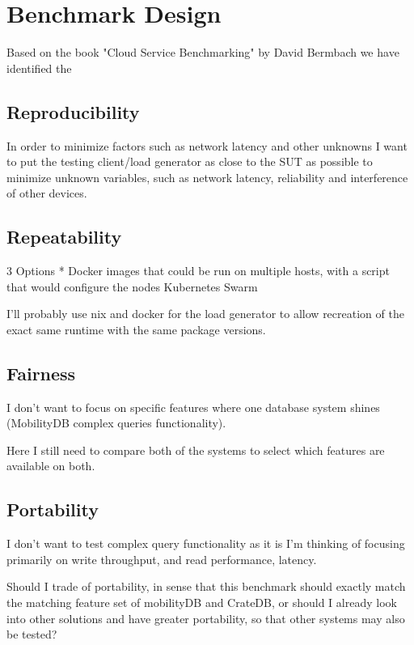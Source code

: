 \section{Benchmark Design}
\label{cha:benchmarkdesign}

Based on the book "Cloud Service Benchmarking" by David Bermbach we have identified the 

\subsection{Reproducibility}
In order to minimize factors such as network latency and other unknowns I want to put the testing client/load generator as close to the SUT as possible to minimize unknown variables, such as network latency, reliability and interference of other devices.

\subsection{Repeatability}
3 Options
* Docker images that could be run on multiple hosts, with a script that would configure the nodes
Kubernetes
Swarm

I'll probably use nix and docker for the load generator to allow recreation of the exact same runtime with the same package versions.

\subsection{Fairness}
I don't want to focus on specific features where one database system shines (MobilityDB complex queries functionality).

Here I still need to compare both of the systems to select which features are available on both.

\subsection{Portability}
I don't want to test complex query functionality as it is 
I'm thinking of focusing primarily on write throughput, and read performance, latency.

Should I trade of portability, in sense that this benchmark should exactly match the matching feature set of mobilityDB and CrateDB, or should I already look into other solutions and have greater portability, so that other systems may also be tested?

